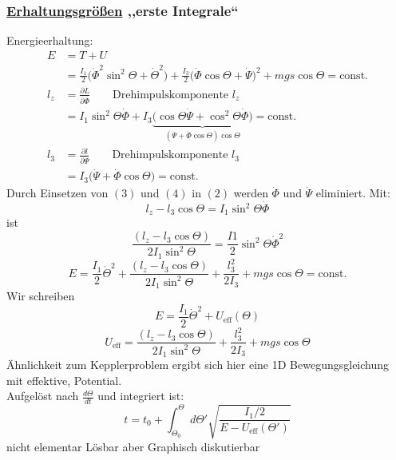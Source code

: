 \documentclass[titlepage,12pt,a4paper,ngerman]{report}
\newcommand{\tx}[1]{\textrm{#1}}
\newcommand{\ub}[1]{\underbrace{#1}}
\newcommand{\const}{\tx{const.}}
\begin{document}
{\subsubsection{\underline{Erhaltungsgrößen} ,,erste Integrale``}
Energieerhaltung:
\begin{align*}
E &= T+U \\
&= \frac{I_1}{2} \bigg( \dot{\Phi} ^2 \sin^2 \Theta + \dot{\Theta}^2 \bigg) + \frac{I_3}{2} \bigg( \dot{\Phi} \cos \Theta + \dot{\Psi} \bigg) ^2 + mgs\cos \Theta = \const \tag{2}\\[20pt]
l_z &= \frac{\partial L}{\partial \dot{\Phi}}\qquad  \tx{Drehimpulskomponente } l_z\\
&= I_1 \sin^2 \Theta \dot{\Phi} + I_3 \ub{ \bigg( \cos \Theta \dot{\Psi} + \cos^2 \Theta \dot{\Phi} \bigg) }_{(\dot{\Psi} + \dot{\Phi} \cos \Theta) \cos \Theta} = \const \tag{3}\\[10pt]
l_3 &= \frac{\partial l}{\partial \dot{\Psi}} \qquad \tx{Drehimpulskomponente } l_3 \\
&= I_3 \bigg( \dot{\Psi} + \dot{\Phi} \cos \Theta \bigg) = \const \tag{4}
\end{align*}
Durch Einsetzen von $(3)$ und $(4)$ in $(2)$ werden $ \dot{\Phi} $ und $ \dot{\Psi} $ eliminiert. Mit:
\begin{equation*}
l_z - l_3 \cos \Theta = I_1 \sin^2 \Theta \dot{\Phi} \tag{5}
\end{equation*}
ist 
\begin{equation*}
\frac{(l_z - l_3 \cos \Theta)}{2 I_1 \sin^2 \Theta} = \frac{I1}{2} \sin^2 \Theta \dot{\Phi}^2 \tag*{in (2)}
\end{equation*}
\begin{equation*}
E = \frac{I_1}{2} \dot{\Theta}^2 + \frac{(l_z - l_3 \cos \Theta)}{2 I_1 \sin^2 \Theta} + \frac{l_3^2}{2 I_3} + mgs \cos \Theta = \const \tag{6}
\end{equation*}
Wir schreiben
$$E = \frac{I_1}{2} \dot{\Theta}^2 + U_{\tx{eff}} (\Theta)$$
\begin{equation*}
U_{\tx{eff}} = \frac{(l_z - l_3 \cos \Theta)}{2 I_1 \sin^2 \Theta} + \frac{l_3^2}{2 I_3} + mgs \cos \Theta \tag{7}
\end{equation*}
Ähnlichkeit zum Kepplerproblem ergibt sich hier eine 1D Bewegungsgleichung mit effektive, Potential.\\
Aufgelöst nach $ \frac{d\Theta}{dt} $ und integriert ist:
\begin{equation*}
t = t_0 + \int_{\Theta_0}^{\Theta} d \Theta' \sqrt{\frac{I_1/2}{E - U_{\tx{eff}} (\Theta')}}
\end{equation*}
nicht elementar Lösbar aber Graphisch diskutierbar
}
\end{document}

